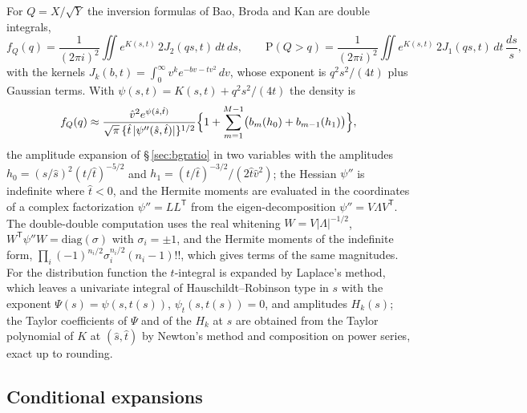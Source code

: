 \documentclass[11pt]{article}
\newcommand{\tp}{^{\mathsf T}}
\newcommand{\pr}{\mathrm{P}}
\begin{document}
For $Q=X/\sqrt Y$ the inversion formulas of Bao, Broda and Kan are double integrals,
\[
f_Q(q)=\frac{1}{(2\pi i)^2}\iint e^{K(s,t)}\,2J_2(qs,t)\,dt\,ds,\qquad
\pr(Q>q)=\frac{1}{(2\pi i)^2}\iint e^{K(s,t)}\,2J_1(qs,t)\,dt\,\frac{ds}{s},
\]
with the kernels $J_k(b,t)=\int_0^\infty v^ke^{-bv-tv^2}\,dv$, whose exponent is $q^2s^2/(4t)$ plus
Gaussian terms. With $\psi(s,t)=K(s,t)+q^2s^2/(4t)$ the density is
\[
f_Q(q)\approx\frac{\hat v^2e^{\psi(\hat s,\hat t)}}{\sqrt{\pi}\,\{\hat t\,|\psi''(\hat s,\hat t)|\}^{1/2}}
\Bigl\{1+\sum_{m=1}^{M-1}\bigl(b_m(h_0)+b_{m-1}(h_1)\bigr)\Bigr\},
\]
the amplitude expansion of \S\,\ref{sec:bgratio} in two variables with the amplitudes
$h_0=(s/\hat s)^2(t/\hat t)^{-5/2}$ and $h_1=(t/\hat t)^{-3/2}/(2\hat t\hat v^2)$; the Hessian
$\psi''$ is indefinite where $\hat t<0$, and the Hermite moments are evaluated in the coordinates of
a complex factorization $\psi''=LL\tp$ from the eigen-decomposition $\psi''=V\Lambda V\tp$. The
double-double computation uses the real whitening $W=V|\Lambda|^{-1/2}$, $W\tp\psi''W=\mathrm{diag}(\sigma)$
with $\sigma_i=\pm1$, and the Hermite moments of the indefinite form,
$\prod_i(-1)^{n_i/2}\sigma_i^{n_i/2}(n_i-1)!!$, which gives terms of the same magnitudes. For the distribution function the $t$-integral is expanded by
Laplace's method, which leaves a univariate integral of Hauschildt--Robinson type in $s$ with the
exponent $\Psi(s)=\psi(s,t(s))$, $\psi_t(s,t(s))=0$, and amplitudes $H_k(s)$; the Taylor coefficients
of $\Psi$ and of the $H_k$ at $\hat s$ are obtained from the Taylor polynomial of $K$ at
$(\hat s,\hat t)$ by Newton's method and composition on power series, exact up to rounding.

\subsection{Conditional expansions}\label{sec:bgcond}
\end{document}
